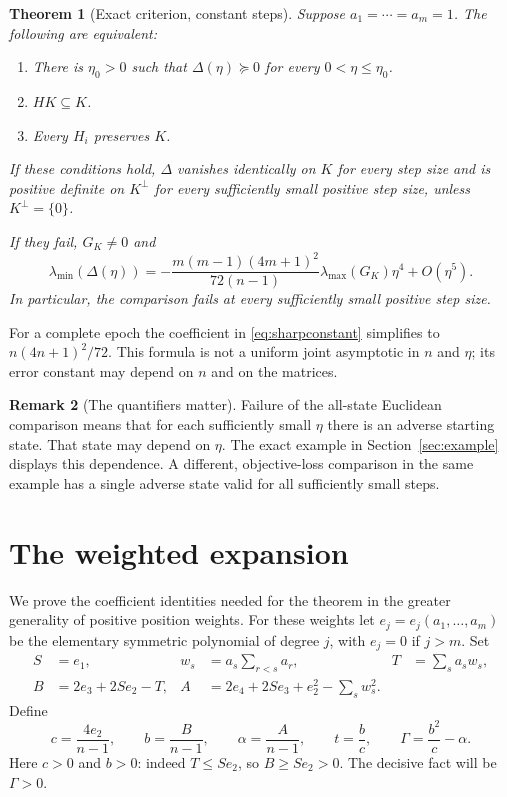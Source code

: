 \documentclass[11pt,letterpaper]{article}
\numberwithin{equation}{section}
\newtheorem{theorem}{Theorem}[section]
\theoremstyle{definition}
\newtheorem{remark}[theorem]{Remark}
\begin{document}
\begin{theorem}[Exact criterion, constant steps]\label{thm:main}
Suppose $a_1=\cdots=a_m=1$. The following are equivalent:
\begin{enumerate}[label=(\roman*),nosep]
\item There is $\eta_0>0$ such that $\Delta(\eta)\succeq0$ for every $0<\eta\le\eta_0$.
\item $HK\subseteq K$.
\item Every $H_i$ preserves $K$.
\end{enumerate}
If these conditions hold, $\Delta$ vanishes identically on $K$ for every step size and is positive definite on $K^\perp$ for every sufficiently small positive step size, unless $K^\perp=\{0\}$.

If they fail, $G_K\ne0$ and
\begin{equation}\label{eq:sharpconstant}
 \lambda_{\min}(\Delta(\eta))
 =-\frac{m(m-1)(4m+1)^2}{72(n-1)}
    \lambda_{\max}(G_K)\eta^4+O(\eta^5).
\end{equation}
In particular, the comparison fails at every sufficiently small positive step size.
\end{theorem}

For a complete epoch the coefficient in \eqref{eq:sharpconstant} simplifies to $n(4n+1)^2/72$. This formula is not a uniform joint asymptotic in $n$ and $\eta$; its error constant may depend on $n$ and on the matrices.

\begin{remark}[The quantifiers matter]\label{rem:quantifiers}
Failure of the all-state Euclidean comparison means that for each sufficiently small $\eta$ there is an adverse starting state. That state may depend on $\eta$. The exact example in Section~\ref{sec:example} displays this dependence. A different, objective-loss comparison in the same example has a single adverse state valid for all sufficiently small steps.
\end{remark}

\section{The weighted expansion}
\label{sec:expansion}

We prove the coefficient identities needed for the theorem in the greater generality of positive position weights. For these weights let $e_j=e_j(a_1,\ldots,a_m)$ be the elementary symmetric polynomial of degree $j$, with $e_j=0$ if $j>m$. Set
\begin{align}
 S&=e_1, & w_s&=a_s\sum_{r<s}a_r, & T&=\sum_s a_sw_s,\label{eq:weights1}\\
 B&=2e_3+2Se_2-T, &
 A&=2e_4+2Se_3+e_2^2-\sum_s w_s^2.\label{eq:weights2}
\end{align}
Define
\begin{equation}\label{eq:abc}
 c=\frac{4e_2}{n-1},\qquad b=\frac{B}{n-1},\qquad
 \alpha=\frac{A}{n-1},\qquad
 t=\frac bc,\qquad \Gamma=\frac{b^2}{c}-\alpha.
\end{equation}
Here $c>0$ and $b>0$: indeed $T\le Se_2$, so $B\ge Se_2>0$. The decisive fact will be $\Gamma>0$.
\end{document}
